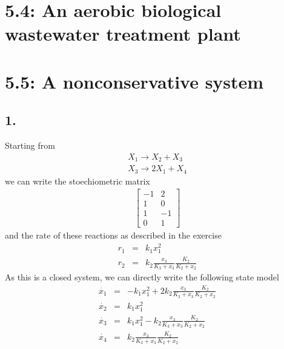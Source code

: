 \section*{5.4: An aerobic biological wastewater treatment plant}





\section*{5.5: A nonconservative system}
\subsection*{1.}
Starting from
\begin{eqnarray*}
X_1\rightarrow X_2+X_3 \\
X_3\rightarrow 2X_1+X_4
\end{eqnarray*}
we can write the stoechiometric matrix
\begin{eqnarray*}
\begin{bmatrix}
-1 & 2 \\
1 & 0 \\
1 & -1 \\
0 & 1
\end{bmatrix}
\end{eqnarray*}
and the rate of these reactions as described in the exercise
\begin{eqnarray*}
r_1 &=& k_1 x_1^2\\
r_2 &=& k_2 \frac{x_3}{K_3+x_3}\frac{K_2}{K_2+x_2}
\end{eqnarray*}
As this is a closed system, we can directly write the following state model
\begin{eqnarray*}
\dot{x_1} &=& - k_1 x_1^2 + 2k_2 \frac{x_3}{K_3+x_3}\frac{K_2}{K_2+x_2} \\
\dot{x_2} &=& k_1 x_1^2  \\
\dot{x_3} &=& k_1 x_1^2 - k_2 \frac{x_3}{K_3+x_3}\frac{K_2}{K_2+x_2} \\
\dot{x_4} &=& k_2 \frac{x_3}{K_3+x_3}\frac{K_2}{K_2+x_2}
\end{eqnarray*}


